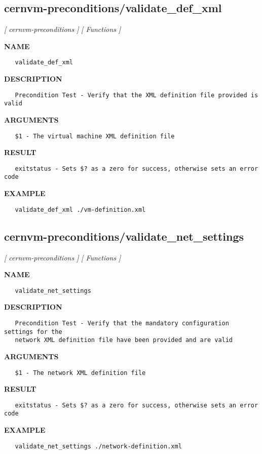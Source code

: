 \subsection{cernvm-preconditions/validate\_def\_xml}
\textsl{[ cernvm-preconditions ]}
\textsl{[ Functions ]}

\label{ch:robo7}
\label{ch:cernvm_preconditions_validate_def_xml}
\textbf{NAME}
\begin{verbatim}
   validate_def_xml
\end{verbatim}
\textbf{DESCRIPTION}
\begin{verbatim}
   Precondition Test - Verify that the XML definition file provided is valid
\end{verbatim}
\textbf{ARGUMENTS}
\begin{verbatim}
   $1 - The virtual machine XML definition file
\end{verbatim}
\textbf{RESULT}
\begin{verbatim}
   exitstatus - Sets $? as a zero for success, otherwise sets an error code
\end{verbatim}
\textbf{EXAMPLE}
\begin{verbatim}
   validate_def_xml ./vm-definition.xml
\end{verbatim}
\newpage
\subsection{cernvm-preconditions/validate\_net\_settings}
\textsl{[ cernvm-preconditions ]}
\textsl{[ Functions ]}

\label{ch:robo8}
\label{ch:cernvm_preconditions_validate_net_settings}
\textbf{NAME}
\begin{verbatim}
   validate_net_settings
\end{verbatim}
\textbf{DESCRIPTION}
\begin{verbatim}
   Precondition Test - Verify that the mandatory configuration settings for the
   network XML definition file have been provided and are valid
\end{verbatim}
\textbf{ARGUMENTS}
\begin{verbatim}
   $1 - The network XML definition file
\end{verbatim}
\textbf{RESULT}
\begin{verbatim}
   exitstatus - Sets $? as a zero for success, otherwise sets an error code
\end{verbatim}
\textbf{EXAMPLE}
\begin{verbatim}
   validate_net_settings ./network-definition.xml
\end{verbatim}
\newpage
